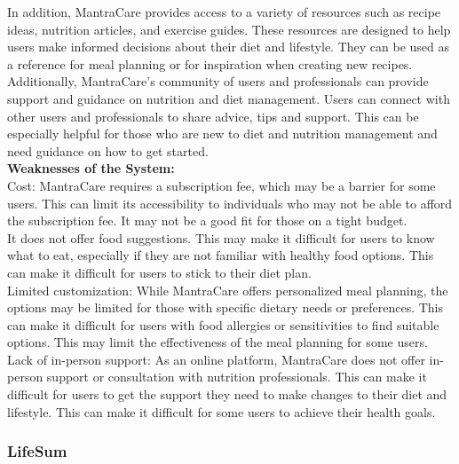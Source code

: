 \documentclass {article}
\begin{document}
\noindent In addition, MantraCare provides access to a variety of resources such as recipe ideas, nutrition articles, and exercise guides. These resources are designed to help users make informed decisions about their diet and lifestyle. They can be used as a reference for meal planning or for inspiration when creating new recipes.\\

\noindent Additionally, MantraCare's community of users and professionals can provide support and guidance on nutrition and diet management. Users can connect with other users and professionals to share advice, tips and support. This can be especially helpful for those who are new to diet and nutrition management and need guidance on how to get started.\\


\noindent \textbf{Weaknesses of the System: \\}
\noindent Cost: MantraCare requires a subscription fee, which may be a barrier for some users. This can limit its accessibility to individuals who may not be able to afford the subscription fee. It may not be a good fit for those on a tight budget.\\

\noindent It does not offer food suggestions. This may make it difficult for users to know what to eat, especially if they are not familiar with healthy food options. This can make it difficult for users to stick to their diet plan. \\

\noindent Limited customization: While MantraCare offers personalized meal planning, the options may be limited for those with specific dietary needs or preferences. This can make it difficult for users with food allergies or sensitivities to find suitable options. This may limit the effectiveness of the meal planning for some users.\\

\noindent Lack of in-person support: As an online platform, MantraCare does not offer in-person support or consultation with nutrition professionals. This can make it difficult for users to get the support they need to make changes to their diet and lifestyle. This can make it difficult for some users to achieve their health goals.
\subsubsection{LifeSum}
\end{document}
